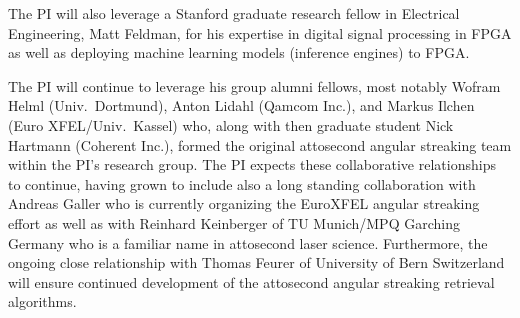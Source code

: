 The PI will also leverage a Stanford graduate research fellow in Electrical Engineering, Matt Feldman, for his expertise in digital signal processing in FPGA as well as deploying machine learning models (inference engines) to FPGA.

The PI will continue to leverage his group alumni fellows, most notably Wofram Helml (Univ.~Dortmund), Anton Lidahl (Qamcom Inc.), and Markus Ilchen (Euro XFEL/Univ.~Kassel) who, along with then graduate student Nick Hartmann (Coherent Inc.), formed the original attosecond angular streaking team within the PI's research group.
The PI expects these collaborative relationships to continue, having grown to include also a long standing collaboration with Andreas Galler who is currently organizing the EuroXFEL angular streaking effort as well as with Reinhard Keinberger of TU Munich/MPQ Garching Germany who is a familiar name in attosecond laser science.
Furthermore, the ongoing close relationship with Thomas Feurer of University of Bern Switzerland will ensure continued development of the attosecond angular streaking retrieval algorithms.

\begin{comment}
\paragraph{Expected publications}
\begin{itemize}
\item``Attoclock Ptychography'' -- Tobias Schweizer \textit{et al.} \cite{Feurer2018},
\item ``Online, single-shot characterization of few-femtosecond X-ray temporal pulse substructures at free-electron lasers via angular streaking'' -- Rupert Heider \textit{et al.},
\item ``Machine Learning enabled x-ray pulse reconstruction'' --  Gregor Hartmann \textit{et al.},
\item ``Machine Learning for streaming x-ray pulse characterization: spectrum, polarization, and time,''
\item ``Shaped attosecond x-ray FEL pulses for nonlinear x-ray science,''
\item ``Direct observation of laser-mixing of valence electronic symmetries.''
\end{itemize}
\end{comment}

